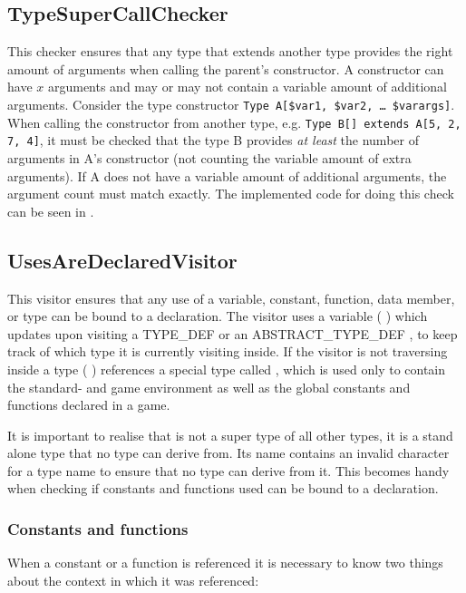 \subsection{TypeSuperCallChecker}
This checker ensures that any type that extends another type provides the right
amount of arguments when calling the parent's constructor. A constructor can have
$x$ arguments and may or may not contain a variable amount of additional
arguments. Consider the type constructor \texttt{Type A[\$var1, \$var2, \dots
\$varargs]}. When calling the constructor from another type, e.g. \texttt{Type
B[] extends A[5, 2, 7, 4]}, it must be checked that the type B provides \emph{at
least} the number of arguments in A's constructor (not counting the variable
amount of extra arguments). If A does not have a variable amount of additional
arguments, the argument count must match exactly. The implemented code for doing
this check can be seen in .



\subsection{UsesAreDeclaredVisitor}
\label{sec:usesaredeclaredvisitor}
This visitor ensures that any use of a variable, constant, function, data
member, or type can be bound to a declaration. The visitor uses a variable
( ) which updates upon visiting a
TYPE\_DEF or an ABSTRACT\_TYPE\_DEF , to keep track of which
type it is currently visiting inside. If the visitor is not traversing inside a
type ( ) references a special type
called , which is used only to contain the standard- and game
environment as well as the global constants and functions declared in a
\productname{} game. 

It is important to realise that  is not a super type of all
other types, it is a stand alone type that no type can derive from. Its name
contains an invalid character for a type name to ensure that no type can derive
from it. This becomes handy when checking if constants and functions used can be
bound to a declaration.

\subsubsection{Constants and functions}
When a constant or a function is referenced it is necessary to know two things
about the context in which it was referenced:

